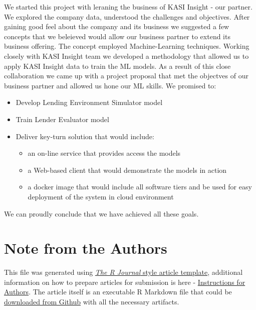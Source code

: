 We started this project with leraning the business of KASI Insight - our
partner. We explored the company data, understood the challenges and
objectives. After gaining good feel about the company and its business
we suggested a few concepts that we beleieved would allow our business
partner to extend its business offering. The concept employed
Machine-Learning techniques. Working closely with KASI Insight team we
developed a methodology that allowed us to apply KASI Insight data to
train the ML models. As a result of this close collaboration we came up
with a project proposal that met the objectves of our business partner
and allowed us hone our ML skills. We promised to:

\begin{itemize}
\tightlist
\item
  Develop Lending Environment Simulator model
\item
  Train Lender Evaluator model
\item
  Deliver key-turn solution that would include:

  \begin{itemize}
  \tightlist
  \item
    an on-line service that provides access the models
  \item
    a Web-based client that would demonstrate the models in action
  \item
    a docker image that would include all software tiers and be used for
    easy deployment of the system in cloud environment
  \end{itemize}
\end{itemize}

We can proudly conclude that we have achieved all these goals.



\hypertarget{note-from-the-authors}{%
\section{Note from the Authors}\label{note-from-the-authors}}

This file was generated using
\href{https://github.com/rstudio/rticles}{\emph{The R Journal} style
article template}, additional information on how to prepare articles for
submission is here -
\href{https://journal.r-project.org/share/author-guide.pdf}{Instructions
for Authors}. The article itself is an executable R Markdown file that
could be
\href{https://github.com/ivbsoftware/big-data-final-2/blob/master/docs/R_Journal/big-data-final-2/}{downloaded
from Github} with all the necessary artifacts.


\address{%
Vadim Spirkov\\
York University School of Continuing Studies\\
\\
}


\address{%
Murlidhar Loka\\
York University School of Continuing Studies\\
\\
}


